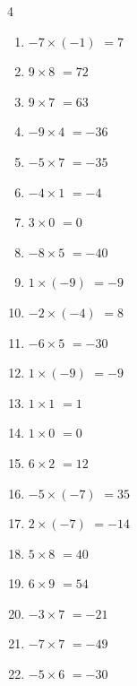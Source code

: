 \begin{multicols}{4}
\begin{enumerate}
  \item $-7\times (-1)$
        $=7$

  \item $9\times 8$
        $=72$

  \item $9\times 7$
        $=63$

  \item $-9\times 4$
        $=-36$

  \item $-5\times 7$
        $=-35$

  \item $-4\times 1$
        $=-4$

  \item $3\times 0$
        $=0$

  \item $-8\times 5$
        $=-40$

  \item $1\times (-9)$
        $=-9$

  \item $-2\times (-4)$
        $=8$

  \item $-6\times 5$
        $=-30$

  \item $1\times (-9)$
        $=-9$

  \item $1\times 1$
        $=1$

  \item $1\times 0$
        $=0$

  \item $6\times 2$
        $=12$

  \item $-5\times (-7)$
        $=35$

  \item $2\times (-7)$
        $=-14$

\columnbreak %

  \item $5\times 8$
        $=40$

  \item $6\times 9$
        $=54$

  \item $-3\times 7$
        $=-21$

  \item $-7\times 7$
        $=-49$

  \item $-5\times 6$
        $=-30$


\end{enumerate}
\end{multicols}

